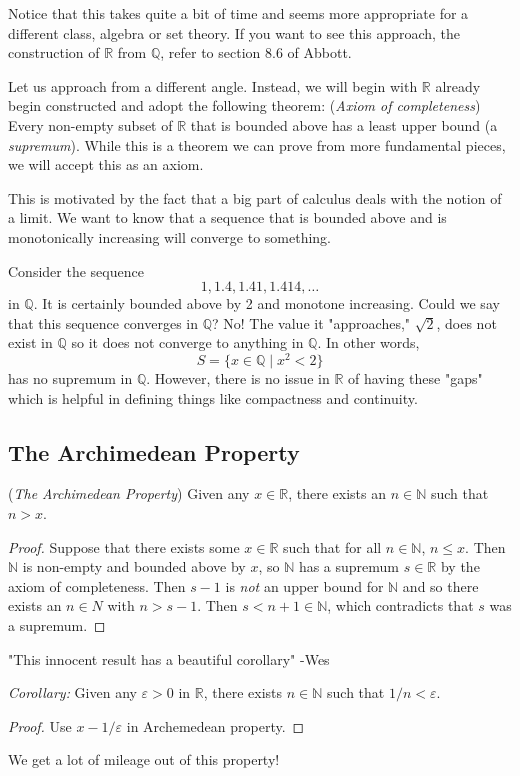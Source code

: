\documentclass[11pt]{article}
\theoremstyle{definition}
\newcommand{\R}{\mathbb{R}}                      %
\newcommand{\Q}{\mathbb{Q}}
\newcommand{\N}{\mathbb{N}}
\begin{document}
Notice that this takes quite a bit of time and seems more appropriate for a different class, algebra or set theory. If you want to see this approach, the construction of $\R$ from $\mathbb{Q}$, refer to section 8.6 of Abbott.

Let us approach from a different angle. Instead, we will begin with $\R$ already begin constructed and adopt the following theorem:
\theorem (\textit{Axiom of completeness}) Every non-empty subset of $\R$ that is bounded above has a least upper bound (a \textit{supremum}). While this is a theorem we can prove from more fundamental pieces, we will accept this as an axiom.

This is motivated by the fact that a big part of calculus deals with the notion of a limit. We want to know that a sequence that is bounded above and is monotonically increasing will converge to something.

\ex Consider the sequence
$$
1, 1.4, 1.41, 1.414,\dots
$$
in $\mathbb{Q}$. It is certainly bounded above by 2 and monotone increasing. Could we say that this sequence converges in $\Q$? No! The value it "approaches," $\sqrt{2}$, does not exist in $\Q$ so it does not converge to anything in $\Q$. In other words,
$$
S=\{x\in\Q\;|\; x^2<2\}
$$
has no supremum in $\Q$. However, there is no issue in $\R$ of having these "gaps" which is helpful in defining things like compactness and continuity.

\subsection{The Archimedean Property}
\prop (\textit{The Archimedean Property}) Given any $x\in\R$, there exists an $n\in \mathbb{N}$ such that $n>x$.
\begin{proof}
    Suppose that there exists some $x\in\R$ such that for all $n\in \N$, $n\leq x$. Then $\N$ is non-empty and bounded above by $x$, so $\N$ has a supremum $s\in\R$ by the axiom of completeness. Then $s-1$ is \textit{not} an upper bound for $\N$ and so there exists an $n\in N$ with $n>s-1$. Then $s<n+1\in\N$, which contradicts that $s$ was a supremum.
\end{proof}
"This innocent result has a beautiful corollary" -Wes

\textit{Corollary:} Given any $\varepsilon>0$ in $\R$, there exists $n\in\N$ such that $1/n<\varepsilon$.
\begin{proof}
    Use $x-1/\varepsilon$ in Archemedean property.
\end{proof}
We get a lot of mileage out of this property!
\end{document}
